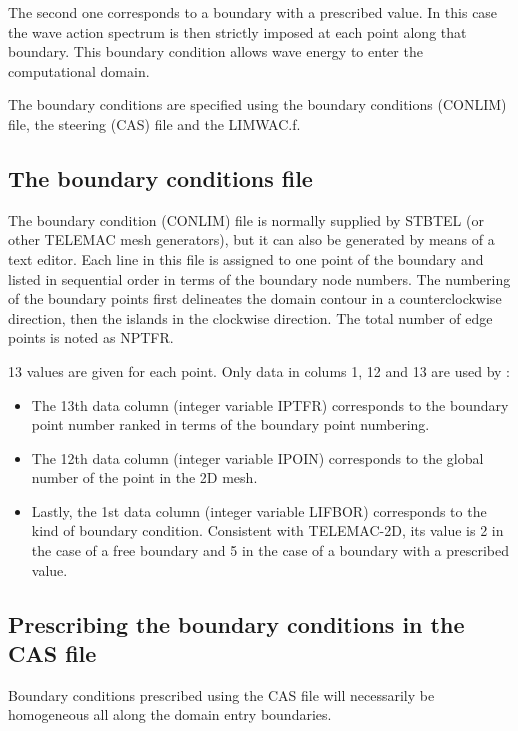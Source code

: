 The second one corresponds to a boundary with a prescribed value. In this case the wave action spectrum is then strictly imposed at each point along that boundary. This boundary condition allows wave energy to enter the computational domain.

 The boundary conditions are specified using the boundary conditions (CONLIM) file, the steering (CAS) file and the LIMWAC.f.


\subsection{ The boundary conditions file}
\label{se:BCfile}
 The boundary condition (CONLIM) file is normally supplied by STBTEL (or other TELEMAC mesh generators), but it can also be generated by means of a text editor. Each line in this file is assigned to one point of the boundary and listed in sequential order in terms of the boundary node numbers. The numbering of the boundary points first delineates the domain contour in a counterclockwise direction, then the islands in the clockwise direction. The total number of edge points is noted as NPTFR.

 13 values are given for each point. Only data in colums 1, 12 and 13 are used by \tomawac:

\begin{itemize}
\item  The 13th data column (integer variable IPTFR) corresponds to the boundary point number ranked in terms of the boundary point numbering.

\item  The 12th data column (integer variable IPOIN) corresponds to the global number of the point in the 2D mesh.

\item  Lastly, the 1st data column (integer variable LIFBOR) corresponds to the kind of boundary condition. Consistent with TELEMAC-2D, its value is 2 in the case of a free boundary and 5 in the case of a boundary with a prescribed value.
\end{itemize}


\subsection{ Prescribing the boundary conditions in the CAS file}

 Boundary conditions prescribed using the CAS file will necessarily be homogeneous all along the domain entry boundaries.

